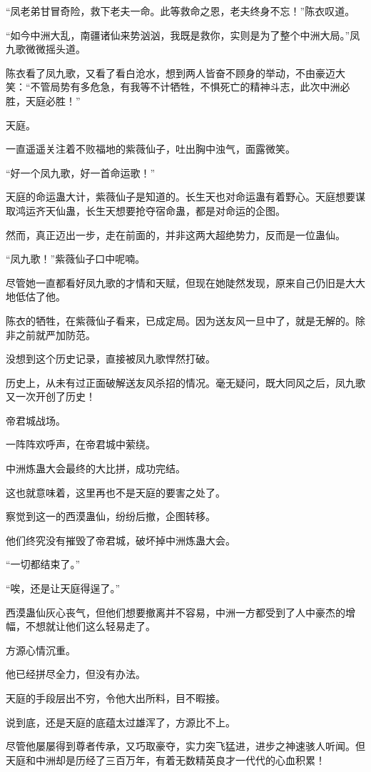 \begin{this_body}
“凤老弟甘冒奇险，救下老夫一命。此等救命之恩，老夫终身不忘！”陈衣叹道。

“如今中洲大乱，南疆诸仙来势汹汹，我既是救你，实则是为了整个中洲大局。”凤九歌微微摇头道。

陈衣看了凤九歌，又看了看白沧水，想到两人皆奋不顾身的举动，不由豪迈大笑：“不管局势有多危急，有我等不计牺牲，不惧死亡的精神斗志，此次中洲必胜，天庭必胜！”

天庭。

一直遥遥关注着不败福地的紫薇仙子，吐出胸中浊气，面露微笑。

“好一个凤九歌，好一首命运歌！”

天庭的命运蛊大计，紫薇仙子是知道的。长生天也对命运蛊有着野心。天庭想要谋取鸿运齐天仙蛊，长生天想要抢夺宿命蛊，都是对命运的企图。

然而，真正迈出一步，走在前面的，并非这两大超绝势力，反而是一位蛊仙。

“凤九歌！”紫薇仙子口中呢喃。

尽管她一直都看好凤九歌的才情和天赋，但现在她陡然发现，原来自己仍旧是大大地低估了他。

陈衣的牺牲，在紫薇仙子看来，已成定局。因为送友风一旦中了，就是无解的。除非之前就严加防范。

没想到这个历史记录，直接被凤九歌悍然打破。

历史上，从未有过正面破解送友风杀招的情况。毫无疑问，既大同风之后，凤九歌又一次开创了历史！

帝君城战场。

一阵阵欢呼声，在帝君城中萦绕。

中洲炼蛊大会最终的大比拼，成功完结。

这也就意味着，这里再也不是天庭的要害之处了。

察觉到这一的西漠蛊仙，纷纷后撤，企图转移。

他们终究没有摧毁了帝君城，破坏掉中洲炼蛊大会。

“一切都结束了。”

“唉，还是让天庭得逞了。”

西漠蛊仙灰心丧气，但他们想要撤离并不容易，中洲一方都受到了人中豪杰的增幅，不想就让他们这么轻易走了。

方源心情沉重。

他已经拼尽全力，但没有办法。

天庭的手段层出不穷，令他大出所料，目不暇接。

说到底，还是天庭的底蕴太过雄浑了，方源比不上。

尽管他屡屡得到尊者传承，又巧取豪夺，实力突飞猛进，进步之神速骇人听闻。但天庭和中洲却是历经了三百万年，有着无数精英良才一代代的心血积累！

\end{this_body}

